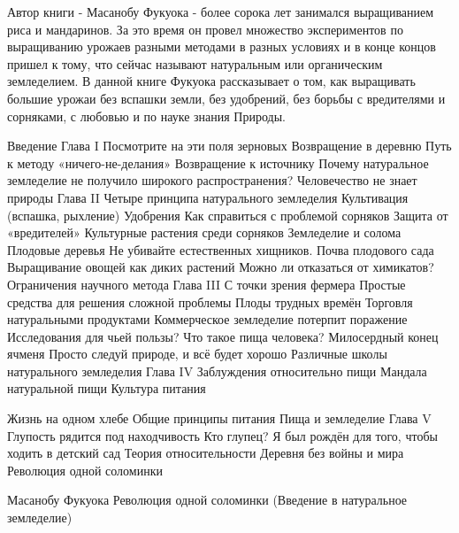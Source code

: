 \documentclass[a4paper]{book}
\begin{document}
Автор книги - Масанобу Фукуока - более сорока лет занимался выращиванием риса и
мандаринов. За это время он провел множество экспериментов по выращиванию урожаев
разными методами в разных условиях и в конце концов пришел к тому, что сейчас называют
натуральным или органическим земледелием. В данной книге Фукуока рассказывает о том,
как выращивать большие урожаи без вспашки земли, без удобрений, без борьбы с
вредителями и сорняками, с любовью и по науке знания Природы.

Введение
Глава I Посмотрите на эти поля зерновых
Возвращение в деревню
Путь к методу «ничего-не-делания»
Возвращение к источнику
Почему натуральное земледелие не получило широкого распространения?
Человечество не знает природы
Глава II Четыре принципа натурального земледелия
Культивация (вспашка, рыхление)
Удобрения
Как справиться с проблемой сорняков
Защита от «вредителей»
Культурные растения среди сорняков
Земледелие и солома
Плодовые деревья
Не убивайте естественных хищников.
Почва плодового сада
Выращивание овощей как диких растений
Можно ли отказаться от химикатов?
Ограничения научного метода
Глава III С точки зрения фермера
Простые средства для решения сложной проблемы
Плоды трудных времён
Торговля натуральными продуктами
Коммерческое земледелие потерпит поражение
Исследования для чьей пользы?
Что такое пища человека?
Милосердный конец ячменя
Просто следуй природе, и всё будет хорошо
Различные школы натурального земледелия
Глава IV Заблуждения относительно пищи
Мандала натуральной пищи
Культура питания

Жизнь на одном хлебе
Общие принципы питания
Пища и земледелие
Глава V Глупость рядится под находчивость
Кто глупец?
Я был рождён для того, чтобы ходить в детский сад
Теория относительности
Деревня без войны и мира
Революция одной соломинки

Масанобу Фукуока
Революция одной соломинки
(Введение в натуральное земледелие)
\end{document}

